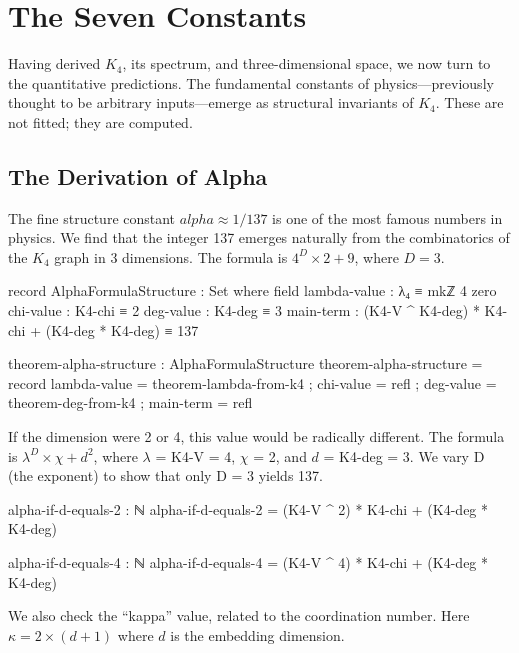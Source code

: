 \documentclass[11pt,a4paper]{book}
\def\alpha{alpha}%
\begin{document}
\chapter{The Seven Constants}
\label{chap:physical-constants}

Having derived $K_4$, its spectrum, and three-dimensional space, we now turn to the 
quantitative predictions. The fundamental constants of physics—previously thought to be 
arbitrary inputs—emerge as structural invariants of $K_4$. These are not fitted; they 
are computed.

\section{The Derivation of Alpha}

The fine structure constant $\alpha \approx 1/137$ is one of the most famous numbers in physics. We find that the integer 137 emerges naturally from the combinatorics of the $K_4$ graph in 3 dimensions. The formula is $4^D \times 2 + 9$, where $D=3$.

\begin{code}
record AlphaFormulaStructure : Set where
  field
    lambda-value : λ₄ ≡ mkℤ 4 zero
    chi-value    : K4-chi ≡ 2
    deg-value    : K4-deg ≡ 3
    main-term    : (K4-V ^ K4-deg) * K4-chi + (K4-deg * K4-deg) ≡ 137

theorem-alpha-structure : AlphaFormulaStructure
theorem-alpha-structure = record
  { lambda-value = theorem-lambda-from-k4
  ; chi-value = refl
  ; deg-value = theorem-deg-from-k4
  ; main-term = refl
  }
\end{code}

If the dimension were 2 or 4, this value would be radically different.
The formula is $\lambda^D \times \chi + d^2$, where $\lambda$ = K4-V = 4, $\chi$ = 2, and $d$ = K4-deg = 3.
We vary D (the exponent) to show that only D = 3 yields 137.

\begin{code}
alpha-if-d-equals-2 : ℕ
alpha-if-d-equals-2 = (K4-V ^ 2) * K4-chi + (K4-deg * K4-deg)

alpha-if-d-equals-4 : ℕ
alpha-if-d-equals-4 = (K4-V ^ 4) * K4-chi + (K4-deg * K4-deg)

\end{code}

We also check the ``kappa'' value, related to the coordination number.
Here $\kappa = 2 \times (d + 1)$ where $d$ is the embedding dimension.
\end{document}
